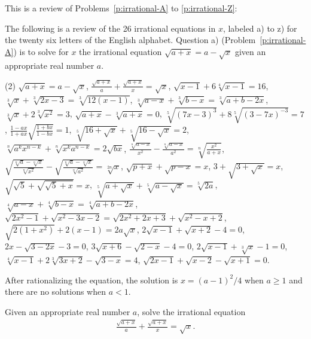 \documentclass[12pt,a4paper]{memoir}
\theoremstyle{definition}
\begin{document}
	This is a review of Problems~\ref{p:irrational-A} to \ref{p:irrational-Z}:
	\begin{question}[name={Irrational Equations Collection}]\label{p:irrational-A}
		The following is a review of the 26 irrational equations in $x$, labeled a) to z) for the twenty six letters of the English alphabet. Question a) (Problem~\ref{p:irrational-A}) is to solve for $x$ the irrational equation $\sqrt{a+x} = a - \sqrt{x}$ given an appropriate real number $a$.
		\begin{tasks}(2)
			\task $\sqrt{a+x} = a - \sqrt{x}$,
			\task $\displaystyle \frac{\sqrt{a+x}}{a}+\frac{\sqrt{a+x}}{x}=\sqrt x$,
			\task $\sqrt{x-1}+6\sqrt[4]{x-1}=16$,
			\task $\sqrt[3]{x}+\sqrt[3]{2x-3}=\sqrt[3]{12(x-1)}$,
			\task $\sqrt[3]{a-x}+\sqrt[3]{b-x}=\sqrt[3]{a+b-2x}$,
			\task $\sqrt[3]{x}+2\sqrt[3]{x^2}=3$,
			\task $\sqrt{a+x}-\sqrt[3]{a+x}=0$,
			\task $\sqrt[5]{(7x-3)^3}+8\sqrt[5]{(3-7x)^{-3}}=7$,
			\task $\displaystyle \frac{1-ax}{1+ax}\sqrt{\frac{1+bx}{1-bx}}=1$,
			\task $\sqrt[5]{16+\sqrt{x}}+\sqrt[5]{16-\sqrt{x}}=2$,
			\task $\sqrt[n]{a^kx^{n-k}}+\sqrt[n]{x^ka^{n-k}}=2\sqrt{bx}$,
			\task $\displaystyle \frac{\sqrt[n]{a-x}}{x^2}-\frac{\sqrt[n]{a-x}}{a^2}=\sqrt[n]{\frac{x^2}{a+x}}$,
			\task $\displaystyle \sqrt{\frac{\sqrt[n]{a}-\sqrt[n]{x}}{\sqrt[n]{x^2}}}-\sqrt{\frac{\sqrt[n]{a}-\sqrt[n]{x}}{\sqrt[n]{a^2}}}=\sqrt[2n]{x}$,
			\task $\sqrt{p+x}+\sqrt{p-x}=x$,
			\task $3+\sqrt{3+\sqrt{x}}=x$,
			\task $\sqrt{\sqrt{5}+\sqrt{\sqrt{5}+x}}=x$,
			\task $\sqrt[5]{a+\sqrt{x}}+\sqrt[5]{a-\sqrt{x}}=\sqrt[5]{2a}$,
			\task $\sqrt[4]{a-x}+\sqrt[4]{b-x}=\sqrt[4]{a+b-2x}$,
			\task $\sqrt{2x^2-1}+\sqrt{x^2-3x-2} = \sqrt{2x^2+2x+3}+\sqrt{x^2-x+2}$,
			\task $\sqrt{2(1+x^2)}+2(x-1)=2a\sqrt{x}$,
			\task $2\sqrt{x-1}+\sqrt{x+2}-4=0$,
			\task $2x-\sqrt{3-2x}-3=0$,
			\task $3\sqrt{x+6}-\sqrt{2-x}-4=0$,
			\task $2\sqrt{x-1}+\sqrt[3]{x}-1=0$,
			\task $\sqrt[4]{x-1}+2\sqrt[3]{3x+2}-\sqrt{3-x}=4$,
			\task $\sqrt{2x-1}+\sqrt{x-2}-\sqrt{x+1}=0$.
		\end{tasks}
	\end{question}


\begin{solution}
	After rationalizing the equation, the solution is $x=(a-1)^2/4$ when $a \geq 1$ and there are no solutions when $a<1$.
\end{solution}

\begin{question}\label{p:irrational-B}
	Given an appropriate real number $a$, solve the irrational equation
	\begin{align*}
		\frac{\sqrt{a+x}}{a}+\frac{\sqrt{a+x}}{x}=\sqrt x.
	\end{align*}
\end{question}
\end{document}
